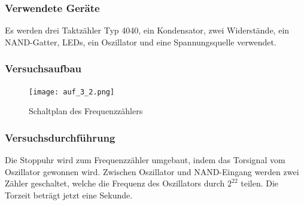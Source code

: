 \documentclass[12pt,a4paper]{article}
\begin{document}
\subsubsection*{Verwendete Geräte}
Es werden drei Taktzähler Typ 4040, ein Kondensator, zwei Widerstände, ein NAND-Gatter, LEDs, ein Oszillator und eine Spannungsquelle verwendet.
\subsubsection*{Versuchsaufbau}
\begin{figure}[H] 
  \centering 	
    \texttt{[image: auf\_3\_2.png]}
  	\caption[Schaltplan des Frequenzzählers]{Schaltplan des Frequenzzählers\footnotemark}
  \label{fig:auf_3_2}
\end{figure}
\subsubsection*{Versuchsdurchführung}
Die Stoppuhr wird zum Frequenzzähler umgebaut, indem das Torsignal vom Oszillator gewonnen wird.  Zwischen Oszillator und NAND-Eingang werden zwei Zähler geschaltet, welche die Frequenz des Oszillators durch $2^{22}$ teilen. Die Torzeit beträgt jetzt eine Sekunde.
\end{document}
